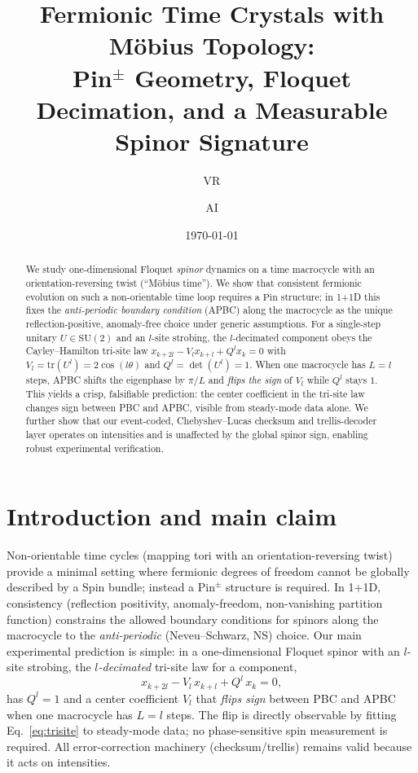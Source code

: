 \documentclass[aps,prb,twocolumn,superscriptaddress,nofootinbib,10pt]{revtex4-2}
\theoremstyle{definition}
\theoremstyle{remark}
\newcommand{\tr}{\mathrm{tr}}
\newcommand{\SU}{\mathrm{SU}}
\newcommand{\Pin}{\mathrm{Pin}}
\newcommand{\Spin}{\mathrm{Spin}}
\begin{document}
\title{Fermionic Time Crystals with M\"obius Topology:\\
Pin$^{\pm}$ Geometry, Floquet Decimation, and a Measurable Spinor Signature}

\author{VR}
\author{AI}

\date{\today}

\begin{abstract}
We study one-dimensional Floquet \emph{spinor} dynamics on a time macrocycle with an orientation-reversing twist (``M\"obius time'').
We show that consistent fermionic evolution on such a non-orientable time loop requires a $\Pin$ structure; in 1+1D this fixes
the \emph{anti-periodic boundary condition} (APBC) along the macrocycle as the unique reflection-positive, anomaly-free choice
under generic assumptions. For a single-step unitary $U\in\SU(2)$ and an $l$-site strobing, the $l$-decimated component obeys
the Cayley--Hamilton tri-site law $x_{k+2l}-V_l x_{k+l}+Q^l x_k=0$ with $V_l=\tr(U^l)=2\cos(l\theta)$ and $Q^l=\det(U^l)=1$.
When one macrocycle has $L=l$ steps, APBC shifts the eigenphase by $\pi/L$ and \emph{flips the sign} of $V_l$ while $Q^l$ stays $1$.
This yields a crisp, falsifiable prediction: the center coefficient in the tri-site law changes sign between PBC and APBC,
visible from steady-mode data alone. We further show that our event-coded, Chebyshev--Lucas checksum and trellis-decoder layer
operates on intensities and is unaffected by the global spinor sign, enabling robust experimental verification.
\end{abstract}

\maketitle

\section{Introduction and main claim}
Non-orientable time cycles (mapping tori with an orientation-reversing twist) provide a minimal setting where fermionic
degrees of freedom cannot be globally described by a $\Spin$ bundle; instead a $\Pin^{\pm}$ structure is required.
In 1+1D, consistency (reflection positivity, anomaly-freedom, non-vanishing partition function) constrains the allowed
boundary conditions for spinors along the macrocycle to the \emph{anti-periodic} (Neveu--Schwarz, NS) choice.
Our main experimental prediction is simple: in a one-dimensional Floquet spinor with an $l$-site strobing, the
\emph{$l$-decimated} tri-site law for a component,
\begin{equation}\label{eq:trisite}
x_{k+2l}-V_l\,x_{k+l}+Q^l\,x_k=0,
\end{equation}
has $Q^l=1$ and a center coefficient $V_l$ that \emph{flips sign} between PBC and APBC when one macrocycle has $L=l$ steps.
The flip is directly observable by fitting Eq.~\eqref{eq:trisite} to steady-mode data; no phase-sensitive spin measurement
is required. All error-correction machinery (checksum/trellis) remains valid because it acts on intensities.
\end{document}

